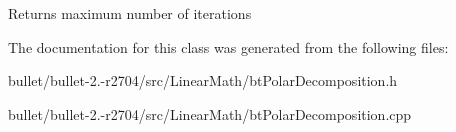 \begin{DoxyReturn}{Returns}
maximum number of iterations 
\end{DoxyReturn}


The documentation for this class was generated from the following files\+:\begin{DoxyCompactItemize}
\item 
bullet/bullet-\/2.-\/r2704/src/\+Linear\+Math/bt\+Polar\+Decomposition.\+h\item 
bullet/bullet-\/2.-\/r2704/src/\+Linear\+Math/bt\+Polar\+Decomposition.\+cpp\end{DoxyCompactItemize}
